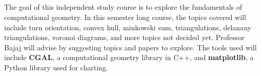 \documentclass[12pt]{article}
\title{\textmd{\bf \Class\\}}
\author{\small \normalfont{Advisor: Chandrajit Bajaj} \\
\small \normalfont{\StudentName}}
\date{}
\begin{document}
\maketitle \thispagestyle{empty}

 \newline \\
\indent The goal of this independent study course is to explore the fundamentals of computational geometry. In this semester long course, the topics covered will include turn orientation, convex hull, minkowski sum, triangulations, delanauy triangulations, voronoi diagrams, and more topics not decided yet. Professor Bajaj will advise by suggesting topics and papers to explore. The tools used will include \textbf{CGAL}, a computational geometry library in C++, and \textbf{matplotlib}, a Python library used for charting.
\newpage
\end{document}

